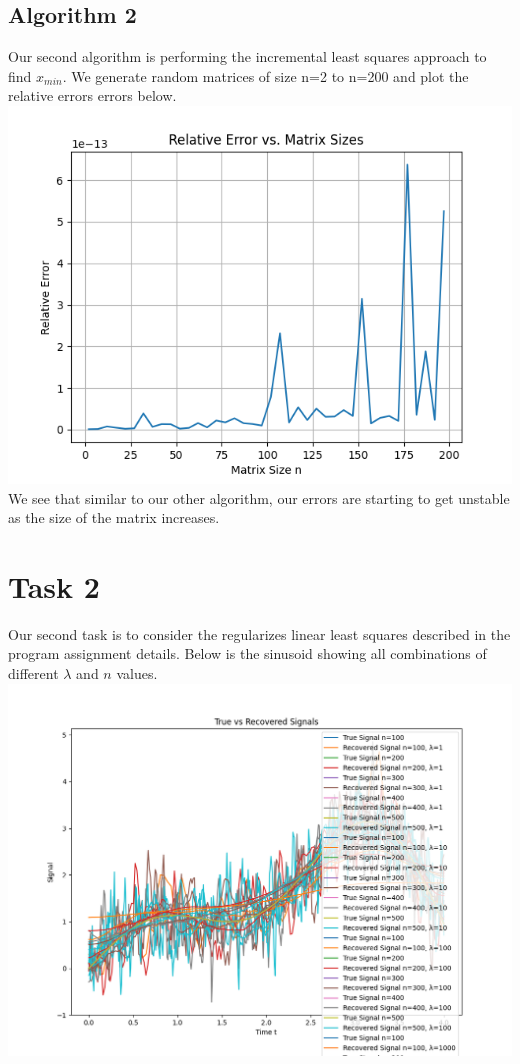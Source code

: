 \documentclass{article}
\begin{document}
\subsection*{Algorithm 2}
Our second algorithm is performing the incremental least squares approach to find $x_{min}$. We generate random matrices of size n=2 to n=200 
and plot the relative errors errors below. \newline
\includegraphics[width=\linewidth]{Images/Figure_4.png}\newline
We see that similar to our other algorithm, our errors are starting to get unstable as the size of the matrix increases.\newline

\section*{Task 2}
Our second task is to consider the regularizes linear least squares described in the program assignment details. Below is the sinusoid 
showing all combinations of different $\lambda$ and $n$ values.\newline
\includegraphics[width=\linewidth]{Images/Figure_5.png}\newline
\end{document}
